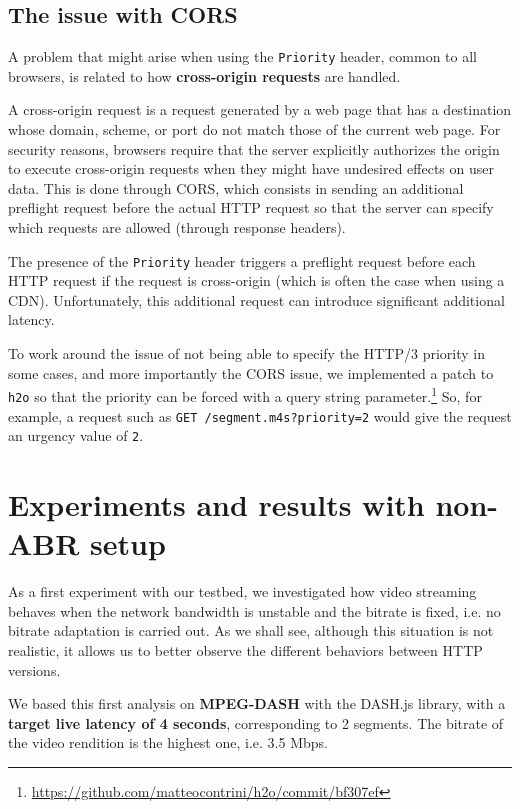 \subsection{The issue with CORS}
\label{sec:eval/browsers/cors}

A problem that might arise when using the \texttt{Priority} header, common to all browsers, is related to how \textbf{cross-origin requests} are handled.

A cross-origin request is a request generated by a web page that has a destination whose domain, scheme, or port do not match those of the current web page. For security reasons, browsers require that the server explicitly authorizes the origin to execute cross-origin requests when they might have undesired effects on user data. This is done through CORS, which consists in sending an additional preflight request before the actual HTTP request so that the server can specify which requests are allowed (through response headers).

The presence of the \texttt{Priority} header triggers a preflight request before each HTTP request if the request is cross-origin (which is often the case when using a CDN). Unfortunately, this additional request can introduce significant additional latency.

To work around the issue of not being able to specify the HTTP/3 priority in some cases, and more importantly the CORS issue, we implemented a patch to \texttt{h2o} so that the priority can be forced with a query string parameter.\footnote{\url{https://github.com/matteocontrini/h2o/commit/bf307ef}} So, for example, a request such as \texttt{GET /segment.m4s?priority=2} would give the request an urgency value of \texttt{2}.

\section{Experiments and results with non-ABR setup}
\label{sec:eval/non-abr}

As a first experiment with our testbed, we investigated how video streaming behaves when the network bandwidth is unstable and the bitrate is fixed, i.e. no bitrate adaptation is carried out. As we shall see, although this situation is not realistic, it allows us to better observe the different behaviors between HTTP versions.

We based this first analysis on \textbf{MPEG-DASH} with the DASH.js library, with a \textbf{target live latency of 4 seconds}, corresponding to 2 segments. The bitrate of the video rendition is the highest one, i.e. 3.5 Mbps.

